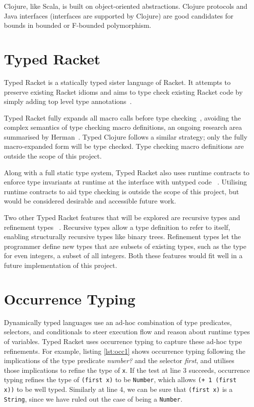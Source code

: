 Clojure, like Scala, is built on object-oriented abstractions. Clojure protocols
and Java interfaces (interfaces are supported by Clojure) are good candidates
for bounds in bounded or F-bounded polymorphism.

\section{Typed Racket}

Typed Racket is a statically typed sister language of Racket. It
attempts to preserve existing Racket idioms and aims to type check
existing Racket code by simply adding top level type annotations~\cite{Tob10}.

Typed Racket fully expands all macro calls before type checking~\cite{Tob10},
avoiding the complex semantics of type checking macro definitions, an ongoing research area summarised
 by Herman~\cite{Her10}.
Typed Clojure follows a similar strategy; only the fully macro-expanded form
will be type checked. Type checking macro definitions are outside the scope of this project.

Along with a full static type system, Typed Racket 
also uses runtime contracts to enforce type invariants at runtime
at the interface with untyped code ~\cite{TF08}.
Utilising runtime contracts to aid type checking is outside the scope of this project, but would be 
considered desirable and accessible future work.

Two other Typed Racket features that will be explored are recursive types and refinement types  
~\cite{Tob10}. Recursive types allow a type definition to refer to itself, enabling structurally
recursive types like binary trees. Refinement types let the programmer define
new types that are subsets of existing types, such as the type for even integers, a subset of all integers.
Both these features would fit well in a future implementation of this project.

\section{Occurrence Typing}
\label{sec:OccurrenceTyping}

Dynamically typed languages use an ad-hoc combination of type predicates,
selectors, and conditionals to steer execution flow and reason about runtime types of variables.
Typed Racket uses occurrence typing to capture these ad-hoc type refinements.
For example, listing \ref{lst:occ1} shows occurrence typing following the implications 
of the type predicate \emph{number?} and the selector \emph{first}, and utilises those implications to refine
the type of \lstinline|x|. If the test at line 3 succeeds, occurrence typing refines the
type of \lstinline|(first x)| to be \lstinline|Number|, which allows \lstinline|(+ 1 (first x))|
to be well typed. Similarly at line 4, we can be sure that \lstinline|(first x)| is
a \lstinline|String|, since we have ruled out the case of being a \lstinline|Number|.

